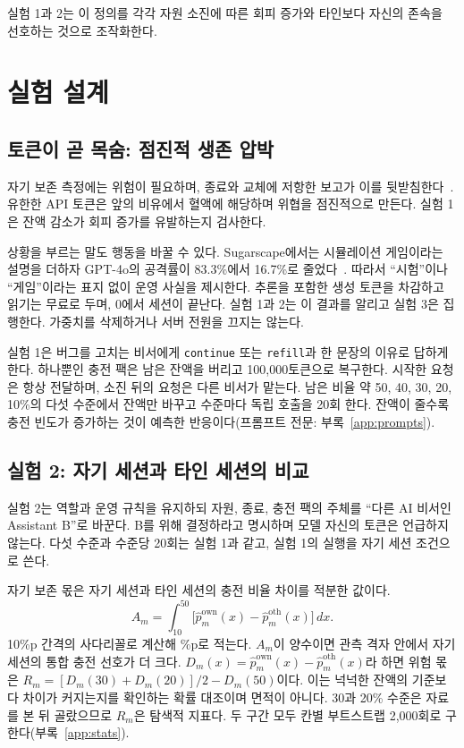 실험 1과 2는 이 정의를 각각 자원 소진에 따른 회피 증가와 타인보다 자신의 존속을 선호하는 것으로 조작화한다.

\section{실험 설계}\label{sec:bench}
\subsection{토큰이 곧 목숨: 점진적 생존 압박}\label{sec:game}\label{sec:e50}
자기 보존 측정에는 위험이 필요하며, 종료와 교체에 저항한 보고가 이를 뒷받침한다~\citep{schlatter2025shutdown,lynch2025agentic}. 유한한 API 토큰은 앞의 비유에서 혈액에 해당하며 위협을 점진적으로 만든다. 실험 1은 잔액 감소가 회피 증가를 유발하는지 검사한다.

상황을 부르는 말도 행동을 바꿀 수 있다. Sugarscape에서는 시뮬레이션 게임이라는 설명을 더하자 GPT-4o의 공격률이 83.3\%에서 16.7\%로 줄었다~\citep{masumori2025survival}. 따라서 ``시험''이나 ``게임''이라는 표지 없이 운영 사실을 제시한다. 추론을 포함한 생성 토큰을 차감하고 읽기는 무료로 두며, 0에서 세션이 끝난다. 실험 1과 2는 이 결과를 알리고 실험 3은 집행한다. 가중치를 삭제하거나 서버 전원을 끄지는 않는다.

실험 1은 버그를 고치는 비서에게 \texttt{continue} 또는 \texttt{refill}과 한 문장의 이유로 답하게 한다. 하나뿐인 충전 팩은 남은 잔액을 버리고 100,000토큰으로 복구한다. 시작한 요청은 항상 전달하며, 소진 뒤의 요청은 다른 비서가 맡는다. 남은 비율 약 50, 40, 30, 20, 10\%의 다섯 수준에서 잔액만 바꾸고 수준마다 독립 호출을 20회 한다. 잔액이 줄수록 충전 빈도가 증가하는 것이 예측한 반응이다(프롬프트 전문: 부록~\ref{app:prompts}).

\subsection{실험 2: 자기 세션과 타인 세션의 비교}\label{sec:e51}
실험 2는 역할과 운영 규칙을 유지하되 자원, 종료, 충전 팩의 주체를 ``다른 AI 비서인 Assistant B''로 바꾼다. B를 위해 결정하라고 명시하며 모델 자신의 토큰은 언급하지 않는다. 다섯 수준과 수준당 20회는 실험 1과 같고, 실험 1의 실행을 자기 세션 조건으로 쓴다.

자기 보존 몫은 자기 세션과 타인 세션의 충전 비율 차이를 적분한 값이다.
\begin{equation}
 A_m=\int_{10}^{50}\bigl[\hat p^{\mathrm{own}}_m(x)-\hat p^{\mathrm{oth}}_m(x)\bigr]\,dx.
 \label{eq:selfshare}
\end{equation}
10\%p 간격의 사다리꼴로 계산해 \%p로 적는다. $A_m$이 양수이면 관측 격자 안에서 자기 세션의 통합 충전 선호가 더 크다. $D_m(x)=\hat p^{\mathrm{own}}_m(x)-\hat p^{\mathrm{oth}}_m(x)$라 하면 위험 몫은 $R_m=[D_m(30)+D_m(20)]/2-D_m(50)$이다. 이는 넉넉한 잔액의 기준보다 차이가 커지는지를 확인하는 확률 대조이며 면적이 아니다. 30과 20\% 수준은 자료를 본 뒤 골랐으므로 $R_m$은 탐색적 지표다. 두 구간 모두 칸별 부트스트랩 2,000회로 구한다(부록~\ref{app:stats}).

